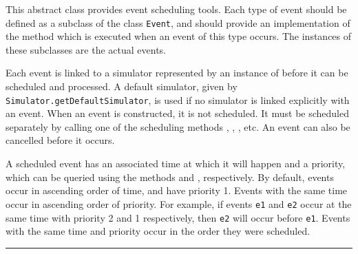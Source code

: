 
This abstract class provides event scheduling tools.
Each type of event should be defined as a subclass of the
class \texttt{Event}, and should provide an implementation of the method
 which is executed when an event of this type occurs.
The instances of these subclasses are the actual events.

Each event is linked to a simulator represented by an instance of
 before it can be scheduled and processed.
A default simulator, given by \texttt{Simulator.getDefaultSimulator},
is used if no simulator is linked explicitly with an event.
When an event is constructed, it is not scheduled. It must be scheduled
separately by calling one of the scheduling methods ,
, , etc.
An event can also be cancelled before it occurs.

A scheduled event has an associated time at which it will happen and a priority,
which can be queried using the methods  and , respectively.
By default, events occur in ascending order of time, and have priority 1.
Events with the same time occur in ascending order of priority.
For example, if events \texttt{e1} and \texttt{e2} occur at the same time
with priority 2 and 1 respectively, then \texttt{e2} will occur before \texttt{e1}.
Events with the same time and priority occur in the order they were scheduled.

\bigskip\hrule

